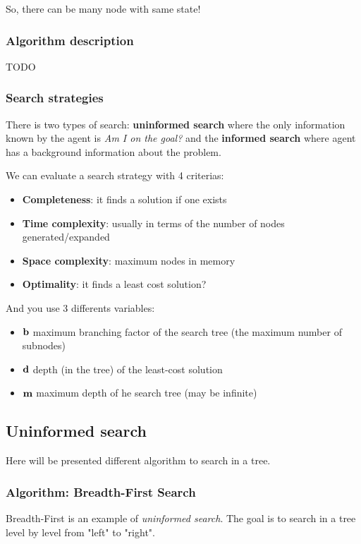 So, there can be many node with same state!

\subsubsection{Algorithm description}

TODO

\subsubsection{Search strategies}

There is two types of  search: \textbf{uninformed search} where the only
information known  by the agent  is \textit{Am I  on the goal?}  and the
\textbf{informed search} where agent  has a background information about
the problem.

We can evaluate a search strategy with 4 criterias:
\begin{itemize}
    \item \textbf{Completeness}: it finds a solution if one exists
    \item \textbf{Time complexity}: usually in terms of the number of nodes generated/expanded
    \item \textbf{Space complexity}: maximum nodes in memory
    \item \textbf{Optimality}: it finds a least cost solution?
\end{itemize}
And you use 3 differents variables:
\begin{itemize}
    \item $\textbf b$  maximum branching factor of the search tree (the maximum number of subnodes)
    \item $\textbf d$  depth (in the tree) of the least-cost solution
    \item $\textbf m$  maximum depth of he search tree (may be infinite)
\end{itemize}



\subsection{Uninformed search}

Here will be presented different algorithm to search in a tree.

\subsubsection{Algorithm: Breadth-First Search}
Breadth-First is an example of \textit{uninformed search}. The goal is to search in a tree level by level from "left" to "right".

